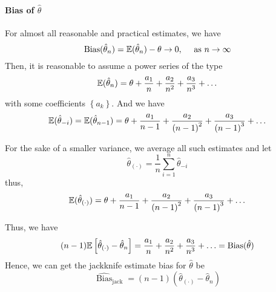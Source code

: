 \paragraph{Bias of $\hat{\theta}$}

For almost all reasonable and practical estimates, we have \begin{equation*}
	\operatorname{Bias}(\hat{\theta}_{n})={\mathbb E}(\hat{\theta}_{n})-\theta\rightarrow 0,\quad\text{ as }n\rightarrow\infty
\end{equation*}
Then, it is reasonable to assume a power series of the type
\begin{equation*}
	{\mathbb E}(\hat{\theta}_{n})=\theta+\frac{a_{1}}{n}+\frac{a_{2}}{n^{2}}+\frac{a_{3}}{n^{3}}+\ldots
\end{equation*}
with some coefficients $\left\{a_{k}\right\}$. And we have
\begin{equation*}
	{\mathbb E}(\hat{\theta}_{-i})={\mathbb E}(\hat{\theta}_{n-1})=\theta+\frac{a_{1}}{n-1}+\frac{a_{2}}{\left(n-1\right)^{2}}+\frac{a_{3}}{\left(n-1\right)^{3}}+\ldots
\end{equation*}

For the sake of a smaller variance, we average all such estimates and let
\begin{equation*}
	\hat{\theta}_{(\cdot)}=\frac{1}{n}\sum_{i=1}^{n}\hat{\theta}_{-i}
\end{equation*}
thus,
\begin{equation*}
	{\mathbb E}(\hat{\theta}_{(\cdot)})=\theta+\frac{a_{1}}{n-1}+\frac{a_{2}}{\left(n-1\right)^{2}}+\frac{a_{3}}{\left(n-1\right)^{3}}+\ldots
\end{equation*}

Thus, we have
\begin{equation*}
	(n-1){\mathbb E}\left[\hat{\theta}_{(\cdot)}-\hat{\theta}_{n}\right]=\frac{a_{1}}{n}+\frac{a_{2}}{n^{2}}+\frac{a_{3}}{n^{3}}+\ldots=\operatorname{Bias}(\hat{\theta})
\end{equation*}
Hence, we can get the jackknife estimate bias for $\hat{\theta}$ be
\begin{equation}
	\widehat{\operatorname{Bias}}_{\text{jack}}=(n-1)\left(\hat{\theta}_{(\cdot)}-\hat{\theta}_{n}\right)
\end{equation}


